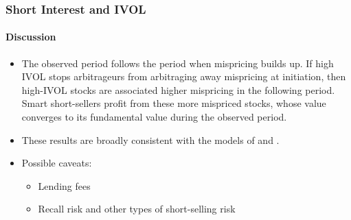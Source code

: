 \documentclass{beamer}
\begin{document}
\begin{frame}
	\frametitle{Short Interest and IVOL}
		\framesubtitle{Discussion}	
\begin{itemize}
\item The observed period follows the period when mispricing builds up. If high IVOL stops arbitrageurs from arbitraging away mispricing at initiation, then high-IVOL stocks are associated higher mispricing in the following period. Smart short-sellers profit from these more mispriced stocks, whose value converges to its fundamental value during the observed period. 

\item These results are broadly consistent with the models of \citet{Stambaugh2015} and \citet{Shleifer1997}.

\item Possible caveats:
 \begin{itemize}
 	\item Lending fees
 	\item Recall risk and other types of short-selling risk 
 \end{itemize}
 
\end{itemize}
\end{frame}  
\end{document}
